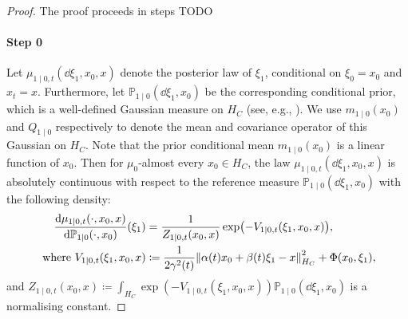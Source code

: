 \begin{proof}
  The proof proceeds in steps TODO
  \paragraph{Step 0}
  Let \(\mu_{1 \mid 0, t}(\dd{\xi_{1}}, x_{0}, x)\) denote the posterior law of \(\xi_{1}\), conditional on \(\xi_{0} = x_{0}\) and \(x_{t} = x\). Furthermore, let \(\mathbb{P}_{1 \mid 0}(\dd{\xi_{1}}, x_{0})\) be the corresponding conditional prior, which is a well-defined Gaussian measure on \(H_{C}\)  (see, e.g., \citealp[][Chapter 3.10]{bogachev1998gaussian}). We use \(m_{1 \mid 0}(x_{0})\) and \(Q_{1 \mid 0}\) respectively to denote the mean and covariance operator of this Gaussian on \(H_{C}\). Note that the prior conditional mean \(m_{1 \mid 0}(x_{0})\) is a linear function of \(x_{0}\). Then for \(\mu_{0}\)-almost every \(x_{0} \in H_{C}\), the law \(\mu_{1 \mid 0, t}(\dd{\xi_{1}, x_{0}, x})\) is absolutely continuous with respect to the reference measure \(\mathbb{P}_{1 \mid 0}(\dd{\xi_{1}}, x_{0})\) with the following density:
  \begin{align*}
    \dv{\mu_{1 \mid 0, t}(\cdot, x_{0}, x)}{\mathbb{P}_{1 \mid 0}(\cdot, x_{0})}{}(\xi_{1}) &= \frac{1}{Z_{1 \mid 0,t}(x_{0}, x)}\exp(- V_{1 \mid 0, t}(\xi_{1}, x_{0}, x)),\\
    \text{ where } V_{1 \mid 0, t}(\xi_{1}, x_{0}, x) &\coloneqq \frac{1}{2\gamma^{2}(t)} \norm{\alpha(t) x_{0}+ \beta(t) \xi_{1} - x}_{H_{C}}^{2} + \Phi(x_{0}, \xi_{1}),
  \end{align*}
  and \(Z_{1 \mid 0,t}(x_{0}, x) \coloneqq \int_{H_{C}} \exp(- V_{1 \mid 0, t}(\xi_{1}, x_{0}, x)) \mathbb{P}_{1 \mid 0} (\dd{\xi_{1}, x_{0}})\) is a normalising constant.

\end{proof}
